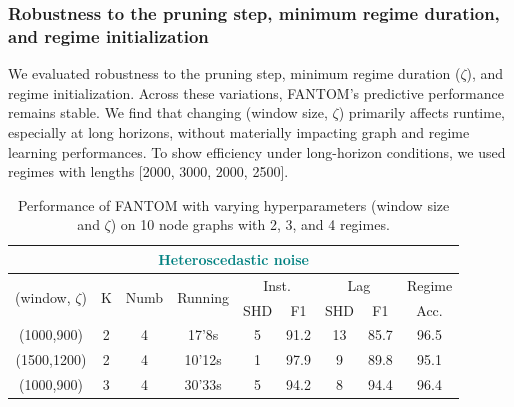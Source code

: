 \subsubsection{Robustness to the pruning step, minimum regime duration, and regime initialization}
We evaluated robustness to the pruning step, minimum regime duration ($\zeta$), and regime initialization. Across these variations, FANTOM’s predictive performance remains stable. We find that changing (window size, $\zeta$) primarily affects runtime, especially at long horizons, without materially impacting graph and regime learning performances. To show efficiency under long-horizon conditions, we used regimes with lengths [2000, 3000, 2000, 2500].
\begin{table}[H]
\centering
\caption{Performance of FANTOM with varying hyperparameters (window size and $\zeta$) on 10 node graphs with 2, 3, and 4 regimes.}
\begin{tabular}{@{}ccccccccc@{}}
\toprule
\multicolumn{9}{c}{\textcolor{teal}{Heteroscedastic noise}}                                                                                                                                                                                                     \\ \midrule
\multicolumn{1}{c|}{\multirow{2}{*}{(window, $\zeta$)}} & \multicolumn{1}{c}{\multirow{2}{*}{K}} & \multirow{2}{*}{Numb} & \multicolumn{1}{c|}{\multirow{2}{*}{Running}} & \multicolumn{2}{c|}{Inst.}      & \multicolumn{2}{c|}{Lag}        & Regime \\ \cmidrule(l){5-8} 
\multicolumn{1}{c|}{}                                   & \multicolumn{1}{c}{}                   &                       & \multicolumn{1}{c|}{}                         & SHD & \multicolumn{1}{c|}{F1}   & SHD & \multicolumn{1}{c|}{F1}   & Acc.   \\ \midrule
\multicolumn{1}{c|}{(1000,900)}                         & \multicolumn{1}{c}{2}                  & 4                     & \multicolumn{1}{c|}{17'8s}                    & 5   & \multicolumn{1}{c|}{91.2} & 13  & \multicolumn{1}{c|}{85.7} & 96.5   \\
\multicolumn{1}{c|}{(1500,1200)}                        & \multicolumn{1}{c}{2}                  & 4                     & \multicolumn{1}{c|}{10'12s}                   & 1   & \multicolumn{1}{c|}{97.9} & 9   & \multicolumn{1}{c|}{89.8} & 95.1   \\ \midrule
\multicolumn{1}{c|}{(1000,900)}                         & \multicolumn{1}{c}{3}                  & 4                     & \multicolumn{1}{c|}{30'33s}                   & 5   & \multicolumn{1}{c|}{94.2} & 8   & \multicolumn{1}{c|}{94.4} & 96.4   \\

\end{tabular}
\end{table}
